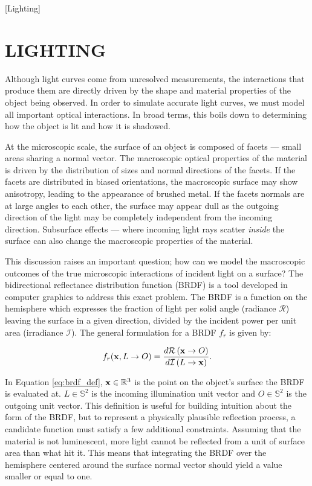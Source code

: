 [Lighting]
\graphicspath{{../PyLightCurves/docs/source/gallery/01-light_curves/images}}

\chapter{LIGHTING}

Although light curves come from unresolved measurements, the interactions that produce them are directly driven by the shape and material properties of the object being observed. In order to simulate accurate light curves, we must model all important optical interactions. In broad terms, this boils down to determining how the object is lit and how it is shadowed. 

At the microscopic scale, the surface of an object is composed of facets ---  small areas sharing a normal vector. The macroscopic optical properties of the material is driven by the distribution of sizes and normal directions of the facets. If the facets are distributed in biased orientations, the macroscopic surface may show anisotropy, leading to the appearance of brushed metal. If the facets normals are at large angles to each other, the surface may appear dull as the outgoing direction of the light may be completely independent from the incoming direction. Subsurface effects ---  where incoming light rays scatter \textit{inside} the surface can also change the macroscopic properties of the material. 

This discussion raises an important question; how can we model the macroscopic outcomes of the true microscopic interactions of incident light on a surface? The bidirectional reflectance distribution function (BRDF) is a tool developed in computer graphics to address this exact problem. The BRDF is a function on the hemisphere which expresses the fraction of light per solid angle (radiance $\mathcal{R}$) leaving the surface in a given direction, divided by the incident power per unit area (irradiance $\mathcal{I}$). The general formulation for a BRDF $f_r$ is given by: \cite{duvenhage2013}

\begin{equation}
    f_r(\mathbf{x}, L \rightarrow O) = \frac{d\mathcal{R}\left(\mathbf{x} \rightarrow O\right)}{d\mathcal{I}\left(L \rightarrow \mathbf{x}\right)}.
    \label{eq:brdf_def}
\end{equation}

In Equation \ref{eq:brdf_def}, $\mathbf{x} \in \mathbb{R}^3$ is the point on the object's surface the BRDF is evaluated at. $L \in \mathbb{S}^2$ is the incoming illumination unit vector and $O \in \mathbb{S}^2$ is the outgoing unit vector. This definition is useful for building intuition about the form of the BRDF, but to represent a physically plausible reflection process, a candidate function must satisfy a few additional constraints. Assuming that the material is not luminescent, more light cannot be reflected from a unit of surface area than what hit it. This means that integrating the BRDF over the hemisphere centered around the surface normal vector should yield a value smaller or equal to one.


